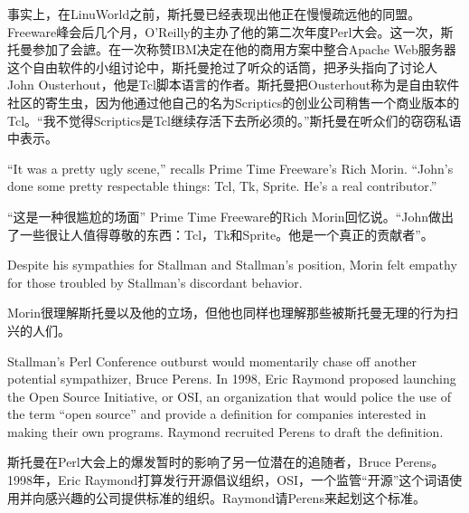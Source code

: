 \ifdefined\chs
事实上，在LinuWorld之前，斯托曼已经表现出他正在慢慢疏远他的同盟。Freeware峰会后几个月，O'Reilly的主办了他的第二次年度Perl大会。这一次，斯托曼参加了会謶。在一次称赞IBM决定在他的商用方案中整合Apache Web服务器这个自由软件的小组讨论中，斯托曼抢过了听众的话筒，把矛头指向了讨论人John Ousterhout，他是Tcl脚本语言的作者。斯托曼把Ousterhout称为是自由软件社区的寄生虫，因为他通过他自己的名为Scriptics的创业公司稍售一个商业版本的Tcl。``我不觉得Scriptics是Tcl继续存活下去所必须的。''斯托曼在听众们的窃窃私语中表示。\endnote{}
\fi

\ifdefined\eng
``It was a pretty ugly scene,'' recalls Prime Time Freeware's Rich Morin. ``John's done some pretty respectable things: Tcl, Tk, Sprite. He's a real contributor.''
\fi

\ifdefined\chs
``这是一种很尴尬的场面'' Prime Time Freeware的Rich Morin回忆说。``John做出了一些很让人值得尊敬的东西：Tcl，Tk和Sprite。他是一个真正的贡献者''。
\fi

\ifdefined\eng
Despite his sympathies for Stallman and Stallman's position, Morin felt empathy for those troubled by Stallman's discordant behavior.
\fi

\ifdefined\chs
Morin很理解斯托曼以及他的立场，但他也同样也理解那些被斯托曼无理的行为扫兴的人们。
\fi

\ifdefined\eng
Stallman's Perl Conference outburst would momentarily chase off another potential sympathizer, Bruce Perens. In 1998, Eric Raymond proposed launching the Open Source Initiative, or OSI, an organization that would police the use of the term ``open source'' and provide a definition for companies interested in making their own programs. Raymond recruited Perens to draft the definition.\endnote{}
\fi

\ifdefined\chs
斯托曼在Perl大会上的爆发暂时的影响了另一位潜在的追随者，Bruce Perens。1998年，Eric Raymond打算发行开源倡议组织，OSI，一个监管``开源''这个词语使用并向感兴趣的公司提供标准的组织。Raymond请Perens来起划这个标准。\endnote{}
\fi



